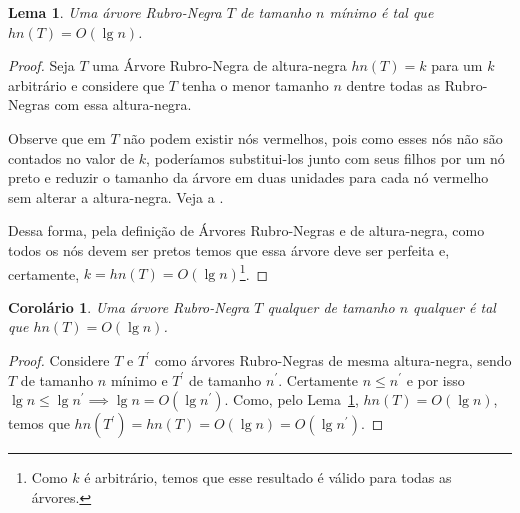 \documentclass[11pt,twoside]{article}
\newtheorem{lemma}[theorem]{Lema}
\newtheorem{corollary}[theorem]{Corolário}
\theoremstyle{definition}
\begin{document}
\begin{lemma} \label{res:hn-min-lgn}
	Uma árvore Rubro-Negra \( T \) de tamanho \( n \) \emph{mínimo} é tal que \( hn(T) = O(\lg n) \).
\end{lemma}
\begin{proof}
	Seja \( T \) uma Árvore Rubro-Negra de altura-negra \( hn(T) = k \) para um \( k \) arbitrário e considere que \( T \) tenha o menor tamanho \( n \) dentre todas as Rubro-Negras com essa altura-negra.

	Observe que em \( T \) não podem existir nós vermelhos, pois como esses nós não são contados no valor de \( k \), poderíamos substitui-los junto com seus filhos por um nó preto e reduzir o tamanho da árvore em duas unidades para cada nó vermelho sem alterar a altura-negra. Veja a .

	\begin{figure}[htb]
		\caption{\label{fig:rn-h-min}}
		\centering
		
	\end{figure}

	Dessa forma, pela definição de Árvores Rubro-Negras e de altura-negra, como todos os nós devem ser pretos temos que essa árvore deve ser perfeita e, certamente, \( k = hn(T) = O(\lg n) \)\footnote{Como \( k \) é arbitrário, temos que esse resultado é válido para todas as árvores.}.
\end{proof}

\begin{corollary}
	Uma árvore Rubro-Negra \( T \) qualquer de tamanho \( n \) \emph{qualquer} é tal que \( hn(T) = O(\lg n) \).
\end{corollary}
\begin{proof}
	Considere \( T \) e \( T^\prime \) como árvores Rubro-Negras de mesma altura-negra, sendo \( T \) de tamanho \( n \) mínimo e \( T^\prime \) de tamanho \( n^\prime \). Certamente \( n \leq n^\prime \) e por isso \( \lg n \leq \lg n^\prime \implies \lg n = O(\lg n^\prime) \). Como, pelo Lema~\ref{res:hn-min-lgn}, \( hn(T) = O(\lg n) \), temos que \( hn(T^\prime) = hn(T) = O(\lg n) = O(\lg n^\prime) \).
\end{proof}
\end{document}
